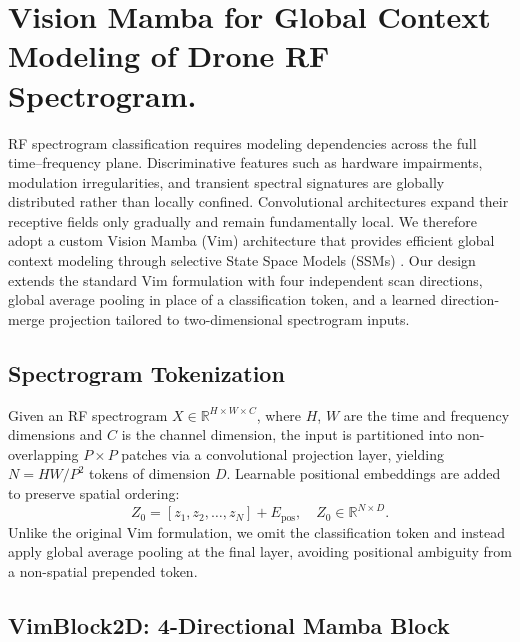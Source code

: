 \documentclass[runningheads]{llncs}
\begin{document}
\section{Vision Mamba for Global Context Modeling of Drone RF Spectrogram.}

RF spectrogram classification requires modeling dependencies across the full
time--frequency plane. Discriminative features such as hardware impairments,
modulation irregularities, and transient spectral signatures are globally
distributed rather than locally confined. Convolutional architectures
expand their receptive fields only gradually and remain fundamentally local.
We therefore adopt a custom Vision Mamba (Vim) architecture \cite{ref26} that provides
efficient global context modeling through selective State Space Models
(SSMs) \cite{ref27,ref28}. Our design extends the standard Vim formulation with four
independent scan directions, global average pooling in place of a
classification token, and a learned direction-merge projection tailored to
two-dimensional spectrogram inputs.

\subsection{Spectrogram Tokenization}

Given an RF spectrogram $X \in \mathbb{R}^{H \times W \times C}$, where
$H$, $W$ are the time and frequency dimensions and $C$ is the channel
dimension, the input is partitioned into non-overlapping $P \times P$
patches via a convolutional projection layer, yielding $N = HW / P^2$ tokens
of dimension $D$. Learnable positional embeddings are added to preserve
spatial ordering:
\begin{equation}
  Z_0 = [z_1, z_2, \dots, z_N] + E_{\text{pos}},
  \quad Z_0 \in \mathbb{R}^{N \times D}.
\end{equation}
Unlike the original Vim formulation, we omit the classification token and
instead apply global average pooling at the final layer, avoiding positional
ambiguity from a non-spatial prepended token.

\subsection{VimBlock2D: 4-Directional Mamba Block}
\end{document}

